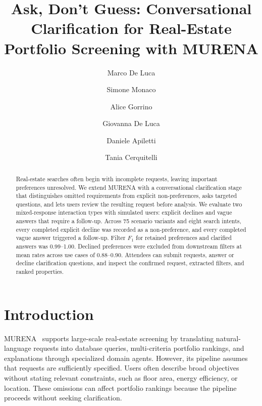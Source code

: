 \documentclass[sigconf,review]{acmart}
\begin{document}
\title[Ask, Don't Guess: Conversational Clarification with MURENA]{Ask, Don't Guess: Conversational Clarification for Real-Estate Portfolio Screening with MURENA}
\author{Marco De Luca}
\author{Simone Monaco}
\author{Alice Gorrino}
\author{Giovanna De Luca}
\author{Daniele Apiletti}
\author{Tania Cerquitelli}
\renewcommand{\shortauthors}{De Luca et al.}




\begin{abstract}
Real-estate searches often begin with incomplete requests, leaving important preferences unresolved. We extend MURENA with a conversational clarification stage that distinguishes omitted requirements from explicit non-preferences, asks targeted questions, and lets users review the resulting request before analysis. We evaluate two mixed-response interaction types with simulated users: explicit declines and vague answers that require a follow-up. Across 75 scenario variants and eight search intents, every completed explicit decline was recorded as a non-preference, and every completed vague answer triggered a follow-up. Filter \(F_1\) for retained preferences and clarified answers was 0.99–1.00. Declined preferences were excluded from downstream filters at mean rates across use cases of 0.88–0.90. Attendees can submit requests, answer or decline clarification questions, and inspect the confirmed request, extracted filters, and ranked properties.
\end{abstract}
\maketitle

\section{Introduction}
\label{sec:intro}

MURENA~\cite{deluca2026murena} supports large-scale real-estate screening by translating natural-language requests into database queries, multi-criteria portfolio rankings, and explanations through specialized domain agents. However, its pipeline assumes that requests are sufficiently specified. Users often describe broad objectives without stating relevant constraints, such as floor area, energy efficiency, or location. These omissions can affect portfolio rankings because the pipeline proceeds without seeking clarification.
\end{document}
